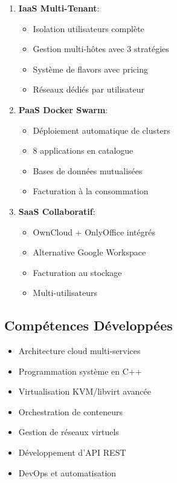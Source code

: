 \documentclass[12pt,a4paper]{article}
\begin{document}
\begin{enumerate}
    \item \textbf{IaaS Multi-Tenant}:
    \begin{itemize}
        \item Isolation utilisateurs complète
        \item Gestion multi-hôtes avec 3 stratégies
        \item Système de flavors avec pricing
        \item Réseaux dédiés par utilisateur
    \end{itemize}
    
    \item \textbf{PaaS Docker Swarm}:
    \begin{itemize}
        \item Déploiement automatique de clusters
        \item 8 applications en catalogue
        \item Bases de données mutualisées
        \item Facturation à la consommation
    \end{itemize}
    
    \item \textbf{SaaS Collaboratif}:
    \begin{itemize}
        \item OwnCloud + OnlyOffice intégrés
        \item Alternative Google Workspace
        \item Facturation au stockage
        \item Multi-utilisateurs
    \end{itemize}
\end{enumerate}

\subsection{Compétences Développées}

\begin{itemize}
    \item Architecture cloud multi-services
    \item Programmation système en C++
    \item Virtualisation KVM/libvirt avancée
    \item Orchestration de conteneurs
    \item Gestion de réseaux virtuels
    \item Développement d'API REST
    \item DevOps et automatisation
\end{itemize}
\end{document}
